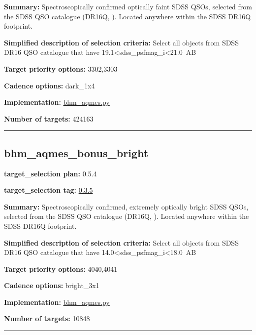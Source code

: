 \noindent\textbf{Summary:} Spectroscopically confirmed optically faint SDSS QSOs,
selected from the SDSS QSO catalogue (DR16Q,
\citealt{Lyke2020}). Located anywhere within the SDSS DR16Q footprint.

\noindent\textbf{Simplified description of selection criteria:} Select all
objects from SDSS DR16 QSO catalogue that have
19.1\textless{}sdss\_psfmag\_i\textless{}21.0~AB


\noindent\textbf{Target priority options:} 3302,3303

\noindent\textbf{Cadence options:} dark\_1x4

\noindent\textbf{Implementation:}
\href{https://github.com/sdss/target_selection/blob/0.3.5/python/target_selection/cartons/bhm_aqmes.py}{bhm\_aqmes.py}

\noindent\textbf{Number of targets:} 424163

\begin{center}\rule{0.5\linewidth}{0.5pt}\end{center}

\hypertarget{bhm_aqmes_bonus_bright_plan0.5.4}{%
\subsection{bhm\_aqmes\_bonus\_bright}\label{bhm_aqmes_bonus_bright_plan0.5.4}}

\noindent\textbf{target\_selection plan:} 0.5.4

\noindent\textbf{target\_selection tag:}
\href{https://github.com/sdss/target_selection/tree/0.3.5/}{0.3.5}

\noindent\textbf{Summary:} Spectroscopically confirmed, extremely optically
bright SDSS QSOs, selected from the SDSS QSO catalogue (DR16Q,
\citealt{Lyke2020}). Located anywhere within the SDSS DR16Q footprint.

\noindent\textbf{Simplified description of selection criteria:} Select all
objects from SDSS DR16 QSO catalogue that have
14.0\textless{}sdss\_psfmag\_i\textless{}18.0~AB


\noindent\textbf{Target priority options:} 4040,4041

\noindent\textbf{Cadence options:} bright\_3x1

\noindent\textbf{Implementation:}
\href{https://github.com/sdss/target_selection/blob/0.3.5/python/target_selection/cartons/bhm_aqmes.py}{bhm\_aqmes.py}

\noindent\textbf{Number of targets:} 10848

\begin{center}\rule{0.5\linewidth}{0.5pt}\end{center}

